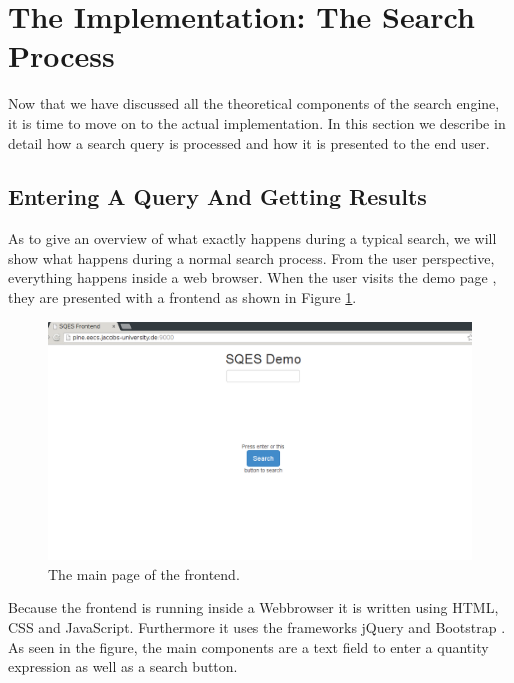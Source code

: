 \section{The Implementation: The Search Process}
\label{sec:pit}

Now that we have discussed all the theoretical components of the search engine, it is time to move on to the actual implementation. In this section we describe in detail how a search query is processed and how it is presented to the end user.

\subsection{Entering A Query And Getting Results}

As to give an overview of what exactly happens during a typical search, we will show what happens during a normal search process. From the user perspective, everything happens inside a web browser. When the user visits the demo page \cite{self:sqesdemo}, they are presented with a frontend as shown in Figure \ref{fig:frontmain}.

\begin{figure}[h]
  \begin{center}
    \includegraphics[width=\textwidth]{img/screen1.png}
  \end{center}
  \caption{The main page of the frontend. }
  \label{fig:frontmain}
\end{figure}

Because the frontend is running inside a Webbrowser it is written using HTML, CSS and JavaScript. Furthermore it uses the frameworks jQuery \cite{lib:jquery} and Bootstrap \cite{lib:bootstrap}. As seen in the figure, the main components are a text field to enter a quantity expression as well as a search button.

